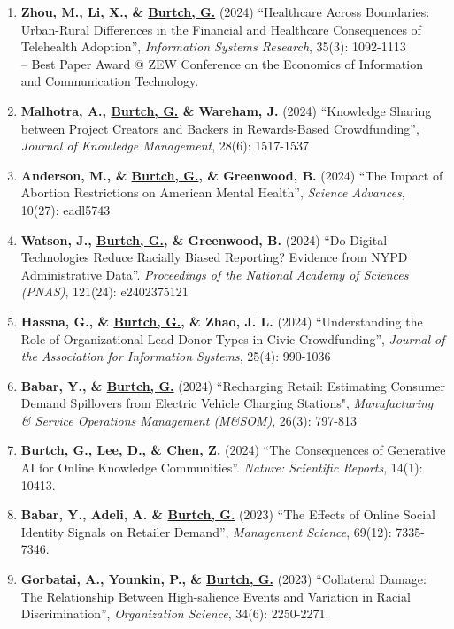 \documentclass[10.5pt,letterpaper,sans]{moderncv}        %
\begin{document}
\begin{enumerate}[leftmargin=!,labelindent=5pt,itemindent=-15pt]
\item \textbf{Zhou, M., Li, X., \& \underline{Burtch, G.}} (2024) ``Healthcare Across Boundaries: Urban-Rural Differences in the Financial and Healthcare Consequences of Telehealth Adoption'', \textit{Information Systems Research}, 35(3): 1092-1113 \\-- Best Paper Award @ ZEW Conference on the Economics of Information and Communication Technology.

\item \textbf{Malhotra, A., \underline{Burtch, G.} \& Wareham, J.} (2024) ``Knowledge Sharing between Project Creators and Backers in Rewards-Based Crowdfunding'', \textit{Journal of Knowledge Management}, 28(6): 1517-1537

\item \textbf{Anderson, M., \& \underline{Burtch, G.}, \& Greenwood, B.} (2024) ``The Impact of Abortion Restrictions on American Mental Health'', \textit{Science Advances}, 10(27): eadl5743

\item \textbf{Watson, J., \underline{Burtch, G.}, \& Greenwood, B.} (2024) ``Do Digital Technologies Reduce Racially Biased Reporting? Evidence from NYPD Administrative Data''. \textit{Proceedings of the National Academy of Sciences (PNAS)}, 121(24): e2402375121

\item \textbf{Hassna, G., \& \underline{Burtch, G.}, \& Zhao, J. L.} (2024) ``Understanding the Role of Organizational Lead Donor Types in Civic Crowdfunding'', \textit{Journal of the Association for Information Systems}, 25(4): 990-1036

\item \textbf{Babar, Y., \& \underline{Burtch, G.}} (2024) ``Recharging Retail: Estimating Consumer Demand Spillovers from Electric Vehicle Charging Stations", \textit{Manufacturing \& Service Operations Management (M\&SOM)}, 26(3): 797-813

\item \textbf{\underline{Burtch, G.}, Lee, D., \& Chen, Z.} (2024) ``The Consequences of Generative AI for Online Knowledge Communities''. \textit{Nature: Scientific Reports}, 14(1): 10413.

\item \textbf{Babar, Y., Adeli, A. \& \underline{Burtch, G.}} (2023) ``The Effects of Online Social Identity Signals on Retailer Demand'', \textit{Management Science}, 69(12): 7335-7346.

\item \textbf{Gorbatai, A., Younkin, P., \& \underline{Burtch, G.}} (2023) ``Collateral Damage: The Relationship Between High-salience Events and Variation in Racial Discrimination'', \textit{Organization Science}, 34(6): 2250-2271.


\end{enumerate}
\end{document}
